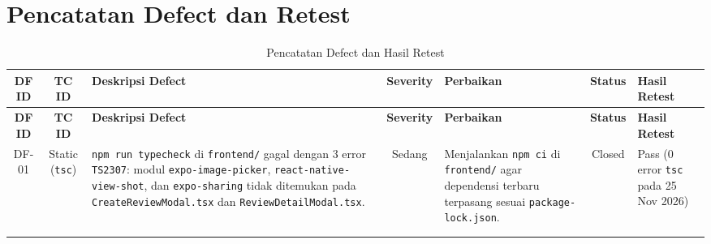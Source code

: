 \chapter{Pencatatan Defect dan Retest}
\label{bab:defect-dan-retest}

\begin{longtable}{|C{0.08}|C{0.10}|L{0.26}|C{0.10}|L{0.22}|C{0.11}|L{0.13}|}
\caption{Pencatatan Defect dan Hasil Retest}\\
\hline
{}\textbf{DF ID} & \textbf{TC ID} & \textbf{Deskripsi Defect} & \textbf{Severity} & \textbf{Perbaikan} & \textbf{Status} & \textbf{Hasil Retest} \\ \hline
\endfirsthead
\hline
{}\textbf{DF ID} & \textbf{TC ID} & \textbf{Deskripsi Defect} & \textbf{Severity} & \textbf{Perbaikan} & \textbf{Status} & \textbf{Hasil Retest} \\ \hline
\endhead
DF-01 & Static (\texttt{tsc}) & \texttt{npm run typecheck} di \texttt{frontend/} gagal dengan 3 error \texttt{TS2307}: modul \texttt{expo-image-picker}, \texttt{react-native-view-shot}, dan \texttt{expo-sharing} tidak ditemukan pada \texttt{CreateReviewModal.tsx} dan \texttt{ReviewDetailModal.tsx}. & Sedang & Menjalankan \texttt{npm ci} di \texttt{frontend/} agar dependensi terbaru terpasang sesuai \texttt{package-lock.json}. & Closed & Pass (0 error \texttt{tsc} pada 25 Nov 2026) \\ \hline
 & & & & & & \\ \hline
 & & & & & & \\ \hline
\end{longtable}

